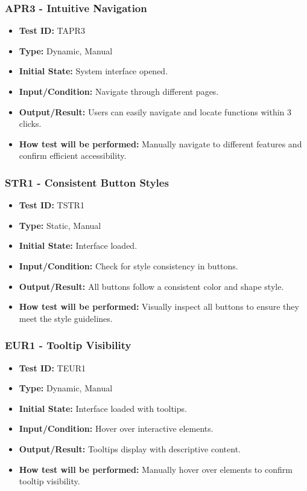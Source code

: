 \documentclass[12pt, titlepage]{article}
\begin{document}
\subsubsection{APR3 - Intuitive Navigation}
\begin{itemize}
    \item \textbf{Test ID:} TAPR3
    \item \textbf{Type:} Dynamic, Manual
    \item \textbf{Initial State:} System interface opened.
    \item \textbf{Input/Condition:} Navigate through different pages.
    \item \textbf{Output/Result:} Users can easily navigate and locate functions within 3 clicks.
    \item \textbf{How test will be performed:} Manually navigate to different features and confirm efficient accessibility.
\end{itemize}

\subsubsection{STR1 - Consistent Button Styles}
\begin{itemize}
    \item \textbf{Test ID:} TSTR1
    \item \textbf{Type:} Static, Manual
    \item \textbf{Initial State:} Interface loaded.
    \item \textbf{Input/Condition:} Check for style consistency in buttons.
    \item \textbf{Output/Result:} All buttons follow a consistent color and shape style.
    \item \textbf{How test will be performed:} Visually inspect all buttons to ensure they meet the style guidelines.
\end{itemize}

\subsubsection{EUR1 - Tooltip Visibility}
\begin{itemize}
    \item \textbf{Test ID:} TEUR1
    \item \textbf{Type:} Dynamic, Manual
    \item \textbf{Initial State:} Interface loaded with tooltips.
    \item \textbf{Input/Condition:} Hover over interactive elements.
    \item \textbf{Output/Result:} Tooltips display with descriptive content.
    \item \textbf{How test will be performed:} Manually hover over elements to confirm tooltip visibility.
\end{itemize}
\end{document}
